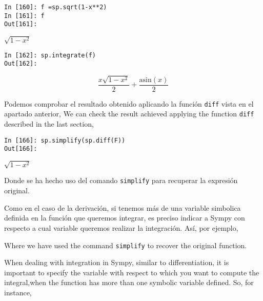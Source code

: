 \begin{center}
	\begin{minipage}{.5\textwidth}
		\begin{verbatim}
In [160]: f =sp.sqrt(1-x**2)
In [161]: f
Out[161]: 
			\end{verbatim}
		$\sqrt{1-x^2}$
		\begin{verbatim}
In [162]: sp.integrate(f)
Out[162]: 
		\end{verbatim}
		\begin{equation*}
			\frac{x\sqrt{1-x^2}}{2}+\frac{\text{asin}(x)}{2}
		\end{equation*}
	\end{minipage}
\end{center}
\begin{paracol}{2}
Podemos comprobar el resultado obtenido aplicando la función \texttt{diff} vista en el apartado anterior,
\switchcolumn
We can check the result achieved applying the function \texttt{diff} described in the last section,
\end{paracol}
\begin{center}
	\begin{minipage}{.5\textwidth}
		\begin{verbatim}
In [166]: sp.simplify(sp.diff(F))
Out[166]:  
		\end{verbatim}
			$\sqrt{1-x^2}$
	\end{minipage}
\end{center}
\begin{paracol}{2}
Donde se ha hecho uso del comando \texttt{simplify} para recuperar la expresión original.

Como en el caso de la derivación, si tenemos más de una variable simbolica definida en la función que queremos integrar, es preciso indicar a Sympy con respecto a cual variable queremos realizar la integración. Así, por ejemplo,

\switchcolumn
Where we have used the command \texttt{simplify} to recover the original function.

When dealing with integration in Sympy, similar to differentiation, it is important to specify the variable with respect to which you want to compute the integral,when the function has more than one symbolic variable defined. So, for instance,
\end{paracol}
